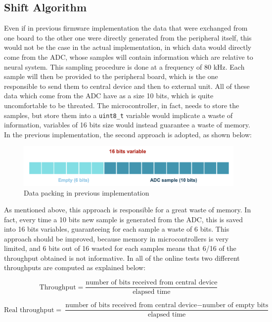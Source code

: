\documentclass{Configuration_Files/PoliMi3i_thesis}
\begin{document}
\subsection{Shift Algorithm}

Even if in previous firmware implementation the data that were exchanged from one board to the other one were directly generated from the peripheral itself, this would not be the case in the actual implementation, in which data would directly come from the ADC, whose samples will contain information which are relative to neural system. This sampling procedure is done at a frequency of 80 kHz. Each sample will then be provided to the peripheral board, which is the one responsible to send them to central device and then to external unit. All of these data which come from the ADC have as a size 10 bits, which is quite uncomfortable to be threated. The microcontroller, in fact, needs to store the samples, but store them into a \texttt{uint8\_t} variable would implicate a waste of information, variables of 16 bits size would instead guarantee a waste of memory. In the previous implementation, the second approach is adopted, as shown below:


\begin{figure}[H]
    \centering
    \includegraphics[scale=0.7]{Shift Algorithm/Screenshot 2024-07-22 at 22.31.12.png}
    \caption{Data packing in previous implementation}
    \label{pairing_procedure}
\end{figure}


As mentioned above, this approach is responsible for a great waste of memory. In fact, every time a 10 bits new sample is generated from the ADC, this is saved into 16 bits variables, guaranteeing for each sample a waste of 6 bits. This approach should be improved, because memory in microcontrollers is very limited, and 6 bits out of 16 wasted for each samples means that 6/16 of the throughput obtained is not informative. In all of the online tests two different throughputs are computed as explained below:

\[
\text{Throughput} = \frac{\text{number of bits received from central device}}{\text{elapsed time}}
\]

\[
\text{Real throughput} = \frac{\text{number of bits received from central device} - \text{number of empty bits}}{\text{elapsed time}}
\]
\end{document}
